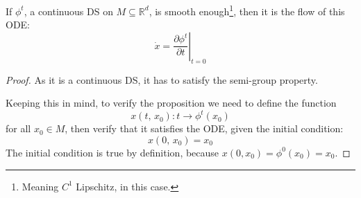 \begin{proposition}
    If $\phi^t$, a continuous DS on $M\subseteq\mathbb{R}^d$, is smooth enough\footnote{Meaning $C^1$ Lipschitz, in this case.}, then it is the flow of this ODE:
\begin{equation*}
    \dot{x}=\left.\frac{\partial \phi^t}{\partial t}\right|_{t=0}
\end{equation*} 
\end{proposition}
\begin{proof}
    As it is a continuous DS, it has to satisfy the semi-group property. 
    
    Keeping this in mind, to verify the proposition we need to define the function
    \begin{equation*}
        x(t,\,x_0):t\rightarrow\phi^{t}(x_0)
    \end{equation*}
    for all $x_0\in M$, then verify that it satisfies the ODE, given the initial condition:
    \begin{equation*}
        x(0,\,x_0)=x_0
    \end{equation*}
    The initial condition is true by definition, because $x(0, x_0)=\phi^0(x_0)=x_0$.


\end{proof}
